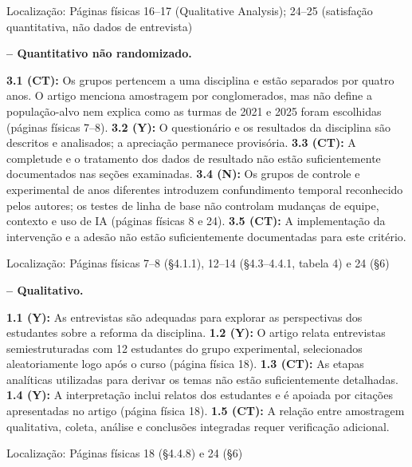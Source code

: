 \noindent Localização: Páginas físicas 16–17 (Qualitative Analysis); 24–25 (satisfação quantitativa, não dados de entrevista)\par

\noindent\textbf{ -- Quantitativo não randomizado.}\nopagebreak[4]

\textbf{3.1 (CT):} Os grupos pertencem a uma disciplina e estão separados por quatro anos. O artigo menciona amostragem por conglomerados, mas não define a população-alvo nem explica como as turmas de 2021 e 2025 foram escolhidas (páginas físicas 7–8). \textbf{3.2 (Y):} O questionário e os resultados da disciplina são descritos e analisados; a apreciação permanece provisória. \textbf{3.3 (CT):} A completude e o tratamento dos dados de resultado não estão suficientemente documentados nas seções examinadas. \textbf{3.4 (N):} Os grupos de controle e experimental de anos diferentes introduzem confundimento temporal reconhecido pelos autores; os testes de linha de base não controlam mudanças de equipe, contexto e uso de IA (páginas físicas 8 e 24). \textbf{3.5 (CT):} A implementação da intervenção e a adesão não estão suficientemente documentadas para este critério.

\noindent Localização: Páginas físicas 7–8 (§4.1.1), 12–14 (§4.3–4.4.1, tabela 4) e 24 (§6)\par

\noindent\textbf{ -- Qualitativo.}\nopagebreak[4]

\textbf{1.1 (Y):} As entrevistas são adequadas para explorar as perspectivas dos estudantes sobre a reforma da disciplina. \textbf{1.2 (Y):} O artigo relata entrevistas semiestruturadas com 12 estudantes do grupo experimental, selecionados aleatoriamente logo após o curso (página física 18). \textbf{1.3 (CT):} As etapas analíticas utilizadas para derivar os temas não estão suficientemente detalhadas. \textbf{1.4 (Y):} A interpretação inclui relatos dos estudantes e é apoiada por citações apresentadas no artigo (página física 18). \textbf{1.5 (CT):} A relação entre amostragem qualitativa, coleta, análise e conclusões integradas requer verificação adicional.

\noindent Localização: Páginas físicas 18 (§4.4.8) e 24 (§6)\par
